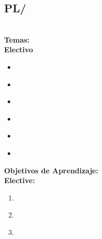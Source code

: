 \subsection{PL/\PLConcurrencyandParallelism}\label{sec:BOK:PLConcurrencyandParallelism}
\PLConcurrencyandParallelismDescription\\
\noindent \textbf{Temas:}\\
\noindent \textbf{Electivo}
\begin{itemize}
	\item \PLConcurrencyandParallelismTopicConstructs\label{sec:BOK:PLConcurrencyandParallelismTopicConstructs}
	\item \PLConcurrencyandParallelismTopicActor\label{sec:BOK:PLConcurrencyandParallelismTopicActor}
	\item \PLConcurrencyandParallelismTopicFutures\label{sec:BOK:PLConcurrencyandParallelismTopicFutures}
	\item \PLConcurrencyandParallelismTopicLanguageSupport\label{sec:BOK:PLConcurrencyandParallelismTopicLanguageSupport}
	\item \PLConcurrencyandParallelismTopicModels\label{sec:BOK:PLConcurrencyandParallelismTopicModels}
	\item \PLConcurrencyandParallelismTopicEffect\label{sec:BOK:PLConcurrencyandParallelismTopicEffect}
\end{itemize}


\noindent \textbf{Objetivos de Aprendizaje:}\\
\noindent \textbf{Elective:}
\begin{enumerate}
	\setcounter{enumi}{0}
	\item \PLConcurrencyandParallelismLOWriteCorrect\xspace[\PLConcurrencyandParallelismLOWriteCorrectLevel]\label{sec:BOK:PLConcurrencyandParallelismLOWriteCorrect}
	\item \PLConcurrencyandParallelismLOUseAModel\xspace[\PLConcurrencyandParallelismLOUseAModelLevel]\label{sec:BOK:PLConcurrencyandParallelismLOUseAModel}
	\item \PLConcurrencyandParallelismLOExplainWhyDo\xspace[\PLConcurrencyandParallelismLOExplainWhyDoLevel]\label{sec:BOK:PLConcurrencyandParallelismLOExplainWhyDo}
\end{enumerate}



